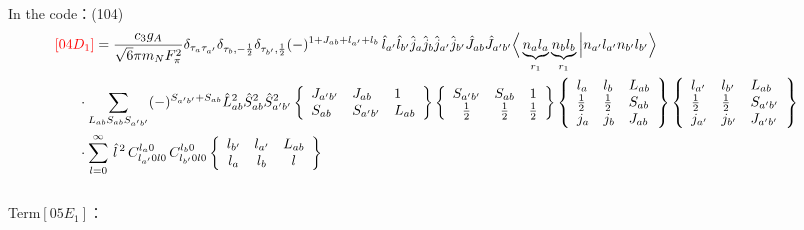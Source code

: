 \documentclass[master]{shnuthesis}
\newcommand{\ap}{a^\prime}
\newcommand{\bp}{b^\prime}
\newcommand{\il}{\!\!\!\!\!\!\!\!\!\!}
\begin{document}
In the code：(104)
\begin{align}
    &\il {\color{red} [04D_1]} = \frac{c_3g_A}{\sqrt{6}\pi m_N F_{\pi}^2} \delta_{\tau_a \tau_{\ap}}\delta_{\tau_b, -\frac{1}{2}}\delta_{\tau_{\bp}, \frac{1}{2}} (-)^{1+J_{ab}+l_{\ap}+l_b}\,\hat{l}_{\ap}\hat{l}_{\bp}\hat{j}_a\hat{j}_b\hat{j}_{\ap}\hat{j}_{\bp}\hat{J}_{ab}\hat{J}_{\ap\bp} \Big\langle \underbrace{n_a l_a}_{r_1} \underbrace{n_b l_b}_{r_1} \Big| n_{\ap} l_{\ap} n_{\bp} l_{\bp} \Big\rangle \notag \\
    & \cdot \sum_{L_{ab}S_{ab}S_{\ap\bp}} (-)^{S_{\ap\bp}+S_{ab}}\hat{L}_{ab}^2\hat{S}_{ab}^2\hat{S}_{\ap\bp}^2  \left\{\begin{array}{lll} J_{\ap\bp} & J_{ab} & 1 \\ S_{ab} & S_{\ap\bp} & L_{ab} \end{array}\right\}    \left\{\begin{array}{ccc} S_{\ap\bp} & S_{ab} & 1 \\ \frac{1}{2} & \frac{1}{2} & \frac{1}{2} \end{array}\right\}  \left\{\begin{array}{lll}l_{a} & l_{b} & L_{ab} \\ \frac{1}{2} & \frac{1}{2} & S_{ab} \\j_{a} & j_{b} & J_{ab} \end{array}\right\}  \left\{\begin{array}{lll}l_{\ap} & l_{\bp} & L_{ab} \\ \frac{1}{2} & \frac{1}{2} & S_{\ap\bp} \\j_{\ap} & j_{\bp} & J_{\ap\bp} \end{array}\right\}  \notag\\
    & \cdot \sum_{l=0}^\infty \,\hat{l}^{\,2}\,C_{l_{\ap} 0 l 0}^{l_a 0} \,C_{l_{\bp} 0 l 0}^{l_b 0}  \left\{\begin{array}{ccc} l_{\bp} & l_{\ap} & L_{ab} \\ l_a & l_b & l \end{array}\right\}
\end{align}
\,\\
{\color{red}Term$[05E_1]$：}
\end{document}
